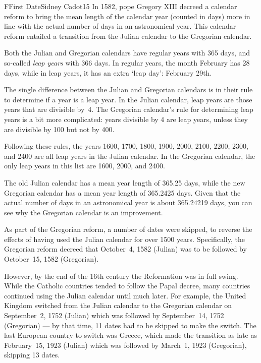 \begin{icpcproblem}{F}{First Date}{Sidney Cadot}{15}
In 1582, pope Gregory XIII decreed a calendar reform to bring the mean length of the calendar year (counted in days)
  more in line with the actual number of days in an astronomical year.
This calendar reform entailed a transition from the Julian calendar to the Gregorian calendar.

Both the Julian and Gregorian calendars have regular years with 365 days, and so-called \emph{leap years} with 366 days.
In regular years, the month February has 28 days, while in leap years, it has an extra `leap day': February 29th.

The single difference between the Julian and Gregorian calendars is in their rule to determine if a year is a leap year.
In the Julian calendar, leap years are those years that are divisible by~4.
The Gregorian calendar's rule for determining leap years is a bit more complicated: years divisible by 4 are leap years, unless they are divisible by 100 but not by 400.

Following these rules, the years 1600, 1700, 1800, 1900, 2000, 2100, 2200, 2300, and 2400 are all leap years in the Julian calendar. In the Gregorian calendar, the only leap years in this list are 1600, 2000, and 2400.

The old Julian calendar has a mean year length of 365.25 days, while the new Gregorian calendar has a mean year length of 365.2425 days.
Given that the actual number of days in an astronomical year is about 365.24219 days, you can see why the Gregorian calendar is an improvement.

As part of the Gregorian reform, a number of dates were skipped, to reverse the effects of having used the Julian calendar for over 1500 years.
Specifically, the Gregorian reform decreed that October~4, 1582 (Julian) was to be followed by October~15, 1582 (Gregorian).

However, by the end of the 16th century the Reformation was in full swing.
While the Catholic countries tended to follow the Papal decree, many countries continued using the Julian calendar until much later.
For example, the United Kingdom switched from the Julian calendar to the Gregorian calendar on September~2, 1752 (Julian) which was followed by September~14, 1752 (Gregorian) --- by that time, 11 dates had to be skipped to make the switch.
The last European country to switch was Greece, which made the transition as late as February~15, 1923 (Julian) which was followed by March~1, 1923 (Gregorian), skipping 13 dates.


\end{icpcproblem}

